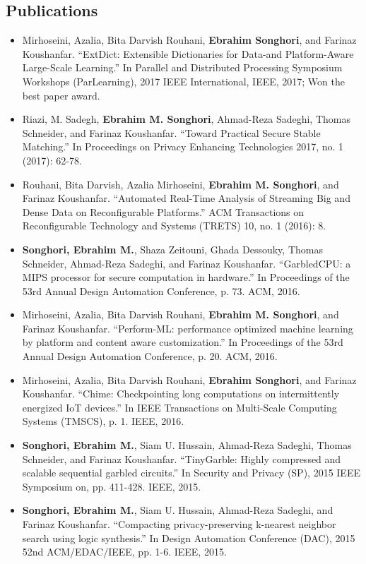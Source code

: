 \documentclass[overlapped]{res}
\begin{document}
\begin{resume}
\section{Publications}
\begin{itemize}
\item Mirhoseini, Azalia, Bita Darvish Rouhani, {\bf Ebrahim Songhori}, and Farinaz Koushanfar. ``ExtDict: Extensible Dictionaries for Data-and Platform-Aware Large-Scale Learning.'' In Parallel and Distributed Processing Symposium Workshops (ParLearning), 2017 IEEE International, IEEE, 2017; Won the best paper award.
\item Riazi, M. Sadegh, {\bf Ebrahim M. Songhori}, Ahmad-Reza Sadeghi, Thomas Schneider, and Farinaz Koushanfar. ``Toward Practical Secure Stable Matching.'' In Proceedings on Privacy Enhancing Technologies 2017, no. 1 (2017): 62-78.
\item Rouhani, Bita Darvish, Azalia Mirhoseini, {\bf Ebrahim M. Songhori}, and Farinaz Koushanfar. ``Automated Real-Time Analysis of Streaming Big and Dense Data on Reconfigurable Platforms.'' ACM Transactions on Reconfigurable Technology and Systems (TRETS) 10, no. 1 (2016): 8.
\item {\bf Songhori, Ebrahim M.}, Shaza Zeitouni, Ghada Dessouky, Thomas Schneider, Ahmad-Reza Sadeghi, and Farinaz Koushanfar. ``GarbledCPU: a MIPS processor for secure computation in hardware.'' In Proceedings of the 53rd Annual Design Automation Conference, p. 73. ACM, 2016.
\item Mirhoseini, Azalia, Bita Darvish Rouhani, {\bf Ebrahim M. Songhori}, and Farinaz Koushanfar. ``Perform-ML: performance optimized machine learning by platform and content aware customization.'' In Proceedings of the 53rd Annual Design Automation Conference, p. 20. ACM, 2016.
\item Mirhoseini, Azalia, Bita Darvish Rouhani, {\bf Ebrahim Songhori}, and Farinaz Koushanfar. ``Chime: Checkpointing long computations on intermittently energized IoT devices.'' In IEEE Transactions on Multi-Scale Computing Systems (TMSCS), p. 1. IEEE, 2016.
\item {\bf Songhori, Ebrahim M.}, Siam U. Hussain, Ahmad-Reza Sadeghi, Thomas Schneider, and Farinaz Koushanfar. ``TinyGarble: Highly compressed and scalable sequential garbled circuits.'' In Security and Privacy (SP), 2015 IEEE Symposium on, pp. 411-428. IEEE, 2015.
\item {\bf Songhori, Ebrahim M.}, Siam U. Hussain, Ahmad-Reza Sadeghi, and Farinaz Koushanfar. ``Compacting privacy-preserving k-nearest neighbor search using logic synthesis.'' In Design Automation Conference (DAC), 2015 52nd ACM/EDAC/IEEE, pp. 1-6. IEEE, 2015.

\end{itemize}
\end{resume}
\end{document}
